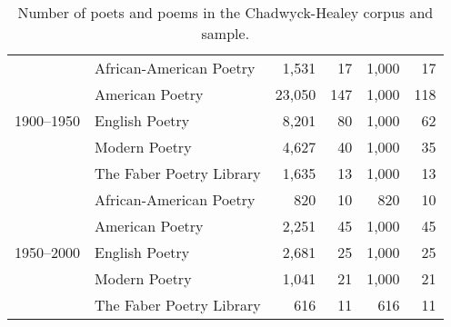 \begin{table}[t]
{\begin{tabular}{llrrrr}
  \cline{1-6}
  \multirow[t]{5}{*}{1900--1950} & African-American Poetry & 1,531 & 17 & 1,000 & 17 \\
   & American Poetry & 23,050 & 147 & 1,000 & 118 \\
   & English Poetry & 8,201 & 80 & 1,000 & 62 \\
   & Modern Poetry & 4,627 & 40 & 1,000 & 35 \\
   & The Faber Poetry Library & 1,635 & 13 & 1,000 & 13 \\
  \cline{1-6}
  \multirow[t]{5}{*}{1950--2000} & African-American Poetry & 820 & 10 & 820 & 10 \\
   & American Poetry & 2,251 & 45 & 1,000 & 45 \\
   & English Poetry & 2,681 & 25 & 1,000 & 25 \\
   & Modern Poetry & 1,041 & 21 & 1,000 & 21 \\
   & The Faber Poetry Library & 616 & 11 & 616 & 11 \\
  \bottomrule
  \end{tabular}
  }
  \caption{Number of poets and poems in the Chadwyck-Healey corpus and sample.}
  \label{tab:num_poems_corpus}
\end{table}